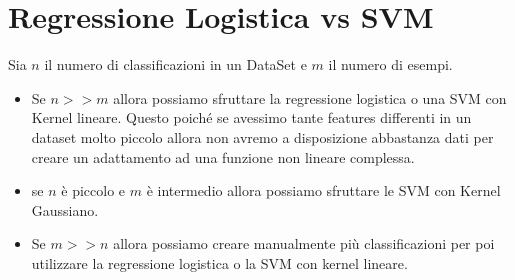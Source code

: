 \section{Regressione Logistica vs SVM}
Sia $n$ il numero di classificazioni in un DataSet e $m$ il numero di esempi. 
\begin{itemize}
    \item Se $n >> m$ allora possiamo sfruttare la regressione logistica o una SVM con Kernel lineare. Questo poiché se avessimo tante features differenti in un dataset molto piccolo allora non avremo a disposizione abbastanza dati per creare un adattamento ad una funzione non lineare complessa.
    \item se $n$ è  piccolo e $m$ è intermedio allora possiamo sfruttare le SVM con Kernel Gaussiano.
    \item Se $m >> n$ allora possiamo creare manualmente più classificazioni per poi utilizzare la regressione logistica o la SVM con kernel lineare.
\end{itemize}




